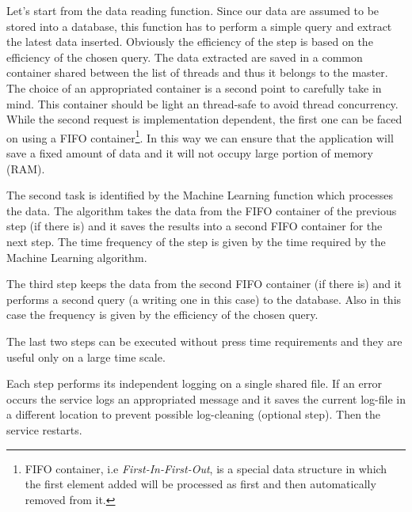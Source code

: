 \documentclass{standalone}
\begin{document}
Let's start from the data reading function.
Since our data are assumed to be stored into a database, this function has to perform a simple query and extract the latest data inserted.
Obviously the efficiency of the step is based on the efficiency of the chosen query.
The data extracted are saved in a common container shared between the list of threads and thus it belongs to the master.
The choice of an appropriated container is a second point to carefully take in mind.
This container should be light an thread-safe to avoid thread concurrency.
While the second request is implementation dependent, the first one can be faced on using a \textsf{FIFO} container\footnote{
  FIFO container, i.e \emph{First-In-First-Out}, is a special data structure in which the first element added will be processed as first and then automatically removed from it.
}.
In this way we can ensure that the application will save a fixed amount of data and it will not occupy large portion of memory (RAM).

The second task is identified by the Machine Learning function which processes the data.
The algorithm takes the data from the FIFO container of the previous step (if there is) and it saves the results into a second FIFO container for the next step.
The time frequency of the step is given by the time required by the Machine Learning algorithm.

The third step keeps the data from the second FIFO container (if there is) and it performs a second query (a writing one in this case) to the database.
Also in this case the frequency is given by the efficiency of the chosen query.

The last two steps can be executed without press time requirements and they are useful only on a large time scale.

Each step performs its independent logging on a single shared file.
If an error occurs the service logs an appropriated message and it saves the current log-file in a different location to prevent possible log-cleaning (optional step).
Then the service restarts.

% 

\end{document}
